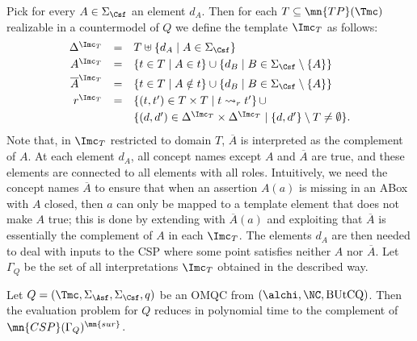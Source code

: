 \documentclass{lmcs}
\theoremstyle{definition}
\begin{document}
\smallskip

Pick for every $A\in \Sigma_{\Csf}$ an element $d_{A}$. 
Then for each $T \subseteq \mn{TP}(\Tmc)$ realizable in a countermodel of $Q$ 
we define the template $\Imc_T$ as follows:
%
$$
\begin{array}{rcl}
  \Delta^{\Imc_T} &=& T \uplus \{ d_A \mid A \in \Sigma_{\Csf} \}\\[1mm]
  A^{\Imc_T} &=& \{ t \in T \mid A \in t \} \cup \{ d_B \mid B \in \Sigma_{\Csf}\setminus \{A\} \} \\[1mm]
  \overline{A}^{\Imc_T} &=& \{ t \in T \mid A \notin t \} \cup \{ d_B
  \mid B \in \Sigma_{\Csf}\setminus\{A\} \} \\[1mm]
  r^{\Imc_T} &=& \{ (t,t') \in T \times T\mid t \rightsquigarrow_r  t'
  \} \, \cup \\[1mm]
  && \{ (d,d') \in \Delta^{\Imc_T} \times \Delta^{\Imc_T} \mid
  \{ d,d'\} \setminus T \neq \emptyset \} .
\end{array}
$$
%
Note that, in $\Imc_T$ restricted to domain $T$, $\overline{A}$ is
interpreted as the complement of $A$. At each element $d_A$, all
concept names except $A$ and $\overline{A}$ are true, and these
elements are connected to all elements with all roles. Intuitively, we
need the concept names $\overline{A}$ to ensure that when an assertion
$A(a)$ is missing in an ABox \Amc with $A$ closed, then $a$ can only
be mapped to a template element that does not make $A$ true; this is
done by extending \Amc with $\overline{A}(a)$ and exploiting that
$\overline{A}$ is essentially the complement of $A$ in each
$\Imc_T$. The elements $d_A$ are then needed to deal with inputs to
the CSP where some point satisfies neither $A$ nor $\overline{A}$.
%
%
Let $\Gamma_{Q}$ be the set of all interpretations $\Imc_T$ obtained in
the described way.
%
%
%
\begin{lem}
  \label{lem:first}
  Let $Q=(\Tmc,\Sigma_\Asf,\Sigma_\Csf,q)$ be an OMQC from
  $(\alchi,\NC,\text{BUtCQ})$. Then the evaluation problem for $Q$ reduces in polynomial time to 
  the complement of $\mn{CSP}(\Gamma_{Q})^{\mn{sur}}$.
\end{lem}
\end{document}

